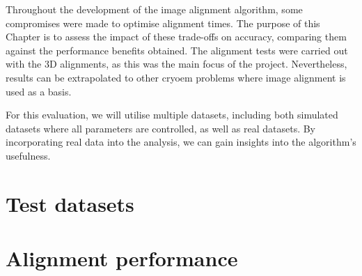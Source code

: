 \documentclass[../main.tex]{subfiles}
\begin{document}
Throughout the development of the image alignment algorithm, some compromises were made to optimise alignment times. The purpose of this Chapter is to assess the impact of these trade-offs on accuracy, comparing them against the performance benefits obtained. The alignment tests were carried out with the 3D alignments, as this was the main focus of the project. Nevertheless, results can be extrapolated to other \gls{cryoem} problems where image alignment is used as a basis.

For this evaluation, we will utilise multiple datasets, including both simulated datasets where all parameters are controlled, as well as real datasets. By incorporating real data into the analysis, we can gain insights into the algorithm's usefulness.

\section{Test datasets}


\section{Alignment performance}

\end{document}
